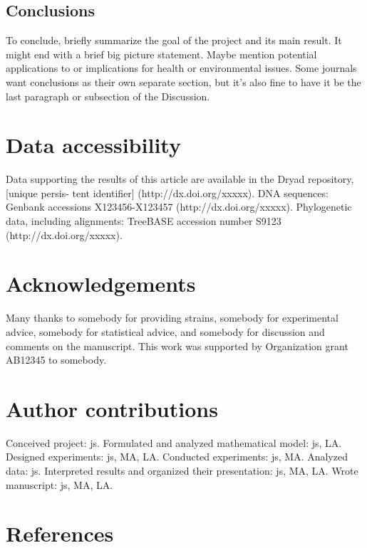\documentclass[11pt]{article}
\begin{document}
\subsection{Conclusions}

To conclude, briefly summarize the goal of the project and its main result. It might end with a brief big picture statement. Maybe mention potential applications to or implications for health or environmental issues. Some journals want conclusions as their own separate section, but it's also fine to have it be the last paragraph or subsection of the Discussion. 



\newpage

\section{Data accessibility}

Data supporting the results of this article are available in the Dryad repository, [unique persis- tent identifier] (http://dx.doi.org/xxxxx). DNA sequences: Genbank accessions X123456-X123457 (http://dx.doi.org/xxxxx). Phylogenetic data, including alignments: TreeBASE accession number S9123 (http://dx.doi.org/xxxxx).

\section{Acknowledgements}

Many thanks to somebody for providing strains, somebody for experimental advice, somebody for statistical advice, and somebody for discussion and comments on the manuscript. This work was supported by Organization grant AB12345 to somebody.

\section{Author contributions}

Conceived project: js. Formulated and analyzed mathematical model: js, LA. Designed experiments: js, MA, LA. Conducted experiments: js, MA. Analyzed data: js. Interpreted results and organized their presentation: js, MA, LA. Wrote manuscript: js, MA, LA. 



\section*{References}
\end{document}
